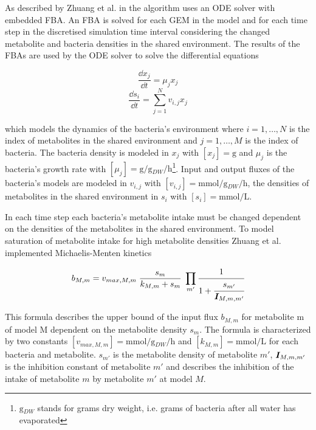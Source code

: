 As described by Zhuang et al. in \cite{zhuang_genome-scale_2011} the algorithm uses an ODE solver with embedded FBA. An FBA is solved
for each GEM in the model and for each time step in the discretised simulation time interval considering the changed metabolite and
bacteria densities in the shared environment. The results of the FBAs are used by the ODE solver to solve the differential equations

\begin{equation} \label{eq:diff_eq_x}
 \frac{\dd x_j}{\dd t} = \mu_j x_j
\end{equation}
\begin{equation} \label{eq:diff_eq_s}
 \frac{\dd s_i}{\dd t} = \displaystyle\sum_{j=1}^{N} v_{i,j} x_j
\end{equation}

which models the dynamics of the bacteria's environment \cite{zhuang_design_2012} where $i = 1,\dotsc,N$ is the index of metabolites in the shared environment and $j = 1,\dotsc,M$ is the index of bacteria.
The bacteria density is modeled in $x_j$ with $\left[ x_j \right] = \si{\gram}$ and $\mu_j$ is the bacteria's growth rate with $[\mu_j] = \si{\gram\per\gram_{DW}\per\hour}$\footnote{$\si{\gram_{DW}}$ stands for grams dry weight, i.e. grams of bacteria after all water has evaporated}.
Input and output fluxes of the bacteria's models are modeled in $v_{i,j}$ with $\left[ v_{i,j} \right] = \si{\milli\mole\per\gram_{DW}\per\hour}$,
the densities of metabolites in the shared environment in $s_i$ with $\left[ s_i \right] = \si{\milli\mole\per\liter}$.

In each time step each bacteria's metabolite intake must be changed dependent on the densities of the metabolites in the shared environment.
To model saturation of metabolite intake for high metabolite densities Zhuang et al. implemented Michaelis-Menten kinetics \cite{johnson2011original}

\begin{equation} \label{eq:michaelis-menten}
 b_{M,m} = v_{max,M,m} \; \frac{s_m}{k_{M,m}+s_m} \; \prod_{m'} \cfrac{1}{1+\cfrac{s_{m'}}{\mat{I}_{M,m,m'}}}
\end{equation}

This formula describes the upper bound of the input flux $b_{M,m}$ for metabolite m of model M dependent on the metabolite density
$s_m$. The formula is characterized by two constants $\left[ v_{max,M,m} \right] = \si{\milli\mole\per\gram_{DW}\per\hour}$ and $\left[ k_{M,m} \right] = \si{\milli\mole\per\liter}$
for each bacteria and metabolite. $s_{m'}$ is the metabolite density of metabolite $m'$, $\bm{I}_{M,m,m'}$ is the inhibition constant of metabolite $m'$ and
describes the inhibition of the intake of metabolite $m$ by metabolite $m'$ at model $M$.

